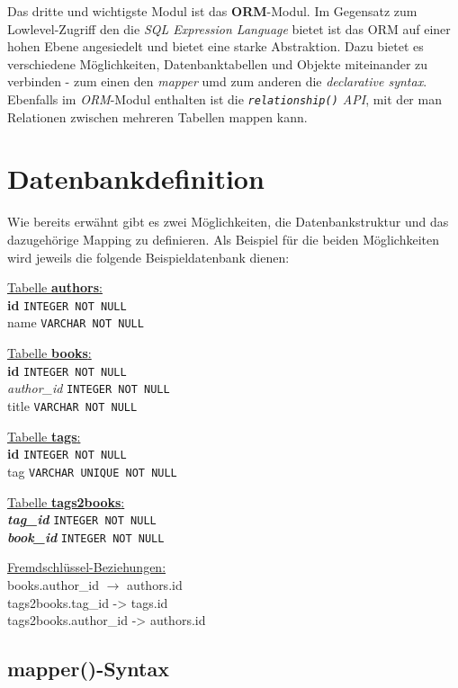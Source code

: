 Das dritte und wichtigste Modul ist das \textbf{ORM}-Modul. Im Gegensatz zum
Lowlevel-Zugriff den die \emph{SQL Expression Language} bietet ist das ORM auf
einer hohen Ebene angesiedelt und bietet eine starke Abstraktion. Dazu bietet es
verschiedene Möglichkeiten, Datenbanktabellen und Objekte miteinander zu
verbinden - zum einen den \emph{mapper} umd zum anderen die \emph{declarative
syntax}. Ebenfalls im \emph{ORM}-Modul enthalten ist die
\emph{\texttt{relationship()} API}, mit der man Relationen zwischen mehreren
Tabellen mappen kann.


\section{Datenbankdefinition}

Wie bereits erwähnt gibt es zwei Möglichkeiten, die Datenbankstruktur und das
dazugehörige Mapping zu definieren. Als Beispiel für die beiden Möglichkeiten
wird jeweils die folgende Beispieldatenbank dienen:

\underline{Tabelle \textbf{authors}:}\\
\textbf{id} \texttt{INTEGER NOT NULL}\\
name \texttt{VARCHAR NOT NULL}

\underline{Tabelle \textbf{books}:}\\
\textbf{id} \texttt{INTEGER NOT NULL}\\
\textit{author\_id} \texttt{INTEGER NOT NULL}\\
title \texttt{VARCHAR NOT NULL}

\underline{Tabelle \textbf{tags}:}\\
\textbf{id} \texttt{INTEGER NOT NULL}\\
tag \texttt{VARCHAR UNIQUE NOT NULL}

\underline{Tabelle \textbf{tags2books}:}\\
\textbf{\textit{tag\_id}} \texttt{INTEGER NOT NULL}\\
\textbf{\textit{book\_id}} \texttt{INTEGER NOT NULL}

\underline{Fremdschlüssel-Beziehungen:}\\
books.author\_id $\rightarrow$ authors.id\\
tags2books.tag\_id -> tags.id\\
tags2books.author\_id -> authors.id

\subsection{mapper()-Syntax}


